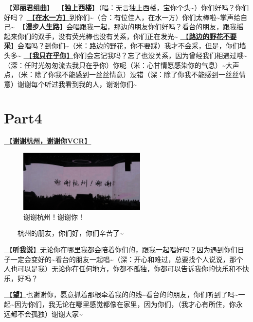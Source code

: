 \documentclass[]{ctexbook}
\begin{document}
🎵【\textbf{邓丽君组曲}】
\hyperref[one-in-the-building]{🎵【\textbf{独上西楼}】}（唱：无言独上西楼，宝你个头\textasciitilde）你们好吗？你们好吗？
\hyperref[on-the-water-side]{🎵【\textbf{在水一方}】}到你们\textasciitilde（合：有位佳人，在水一方）你们太棒啦\textasciitilde 掌声给自己\textasciitilde{}
\hyperref[walk-the-road-of-life]{🎵【\textbf{漫步人生路}】}会唱跟我一起，那边的朋友你们好吗？看台的朋友，跟我摇起来你们的双手，没有荧光棒也没有关系，你们正在发光\textasciitilde{}
\hyperref[only-with-me]{🎵【\textbf{路边的野花不要采}】}会唱吗？到你们\textasciitilde（米：路边的野花，你不要踩）我才不会采，但是，你们墙头多\textasciitilde{}
\hyperref[only-you]{🎵【\textbf{我只在乎你}】}你们会忘记我吗？忘了也没关系，因为曾经我们相遇过哦\textasciitilde（深：任时光匆匆流去我只在乎你）你呢（米：心甘情愿感染你的气息）\textasciitilde 大声点，（米：除了你我不能感到一丝丝情意）没错（深：除了你我不能感到一丝丝情意）谢谢每个听过我看到我的人，谢谢你们\textasciitilde{}

\section{Part4}\label{hangzhou-20240824-part4}

\hyperref[thank-you-vcr]{🎥【\textbf{谢谢杭州，谢谢你VCR}】}

\begin{figure}

{\centering \includegraphics[width=180pt]{img/hangzhou20240824/thank-hangzhou} 

}

\caption{谢谢杭州！谢谢你！}\label{fig:unnamed-chunk-79}
\end{figure}

  杭州的朋友，你们好，你们辛苦了\textasciitilde{}

\hyperref[listen-to-me]{🎵【\textbf{听我说}】}无论你在哪里我都会陪着你们的，跟我一起唱好吗？因为遇到你们日子一定会变好的\textasciitilde 看台的朋友一起唱\textasciitilde（深：开心和难过，总要找个人说说，那个人也可以是我）无论你在任何地方，你都不孤独，你都可以告诉我你的快乐和不快乐，好吗？

\hyperref[hope]{🎵【\textbf{望}】}也谢谢你，愿意抓着那根牵着我的的线\textasciitilde 看台的的朋友，你们听到了吗\textasciitilde 一起\textasciitilde 因为你们，我无论在哪里感觉都像在家里，因为你们，（我才心有所住，你永远都不会孤独）谢谢大家\textasciitilde{}
\end{document}
